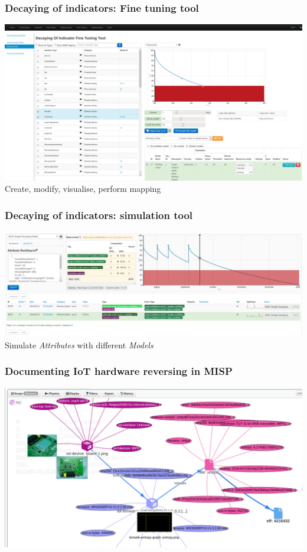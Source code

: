 \begin{frame}
    \frametitle{Decaying of indicators: Fine tuning tool}
    \includegraphics[width=1.00\linewidth]{decaying-tool.png}
    Create, modify, visualise, perform mapping
\end{frame}

\begin{frame}
    \frametitle{Decaying of indicators: simulation tool}
    \includegraphics[width=1.00\linewidth]{decaying-simulation.png}
    Simulate \textit{Attributes} with different \textit{Models}
\end{frame}

\begin{frame}
\frametitle{Documenting IoT hardware reversing in MISP}
\includegraphics[scale=0.25]{iot-2.png}
\end{frame}

